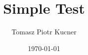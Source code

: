 \documentclass[aspectratio=169]{beamer}
\title[Simple Test]{Simple Test}
\author[TPK] {Tomasz Piotr Kucner}
\institute[Aalto Univeristy] %
{
    Aalto University
}
\date{\today} %
\begin{document}
\begin{frame}
    \titlepage
\end{frame}


\end{document}
